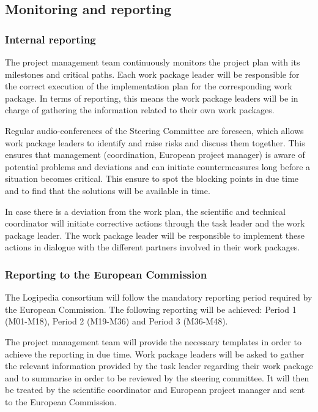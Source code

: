 \subsection{Monitoring and reporting}

\subsubsection*{Internal reporting}

The project management team continuously monitors the project plan
with its milestones and critical paths. Each work package leader will be
responsible for the correct execution of the implementation plan for
the corresponding work package. In terms of reporting, this means the work package leaders
will be in charge of gathering the information related to their own
work packages.

Regular audio-conferences of the Steering Committee are foreseen,
which allows work package leaders to identify and raise risks and
discuss them together. This ensures that management (coordination,
European project manager) is aware of potential problems and
deviations and can initiate countermeasures long before a situation
becomes critical. This ensure to spot the blocking points in due time
and to find that the solutions will be available in time.

In case there is a deviation from the work plan, the scientific and
technical coordinator will initiate corrective actions through the
task leader and the work package leader. The work package leader will
be responsible to implement these actions in dialogue with the
different partners involved in their work packages.


\subsubsection*{Reporting to the European Commission}

The Logipedia consortium will follow the mandatory reporting period
required by the European Commission. The following reporting will be
achieved: Period 1 (M01-M18), Period 2 (M19-M36) and Period 3
(M36-M48).

The project management team will provide the necessary templates in
order to achieve the reporting in due time. Work package leaders will
be asked to gather the relevant information provided by the task
leader regarding their work package and to summarise in order to be
reviewed by the steering committee. It will then be treated by the
scientific coordinator and European project manager and sent to the
European Commission.

